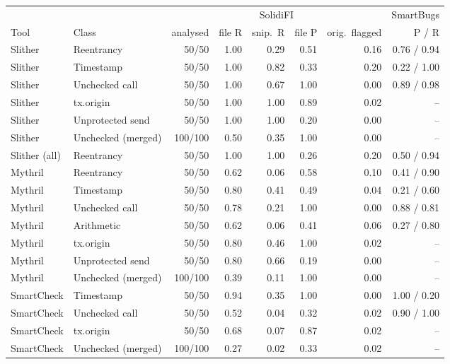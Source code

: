 \begin{tabular}{@{}llrrrrrr@{}}
\toprule
 & & \multicolumn{5}{c}{SolidiFI} & SmartBugs\\
\cmidrule(lr){3-7}\cmidrule(lr){8-8}
Tool & Class & analysed & file R & snip.\ R & file P & orig.\ flagged & P / R\\
\midrule
Slither & Reentrancy & 50/50 & 1.00 & 0.29 & 0.51 & 0.16 & 0.76 / 0.94\\
Slither & Timestamp & 50/50 & 1.00 & 0.82 & 0.33 & 0.20 & 0.22 / 1.00\\
Slither & Unchecked call & 50/50 & 1.00 & 0.67 & 1.00 & 0.00 & 0.89 / 0.98\\
Slither & tx.origin & 50/50 & 1.00 & 1.00 & 0.89 & 0.02 & --\\
Slither & Unprotected send & 50/50 & 1.00 & 1.00 & 0.20 & 0.00 & --\\
Slither & Unchecked (merged) & 100/100 & 0.50 & 0.35 & 1.00 & 0.00 & --\\
Slither (all) & Reentrancy & 50/50 & 1.00 & 1.00 & 0.26 & 0.20 & 0.50 / 0.94\\
Mythril & Reentrancy & 50/50 & 0.62 & 0.06 & 0.58 & 0.10 & 0.41 / 0.90\\
Mythril & Timestamp & 50/50 & 0.80 & 0.41 & 0.49 & 0.04 & 0.21 / 0.60\\
Mythril & Unchecked call & 50/50 & 0.78 & 0.21 & 1.00 & 0.00 & 0.88 / 0.81\\
Mythril & Arithmetic & 50/50 & 0.62 & 0.06 & 0.41 & 0.06 & 0.27 / 0.80\\
Mythril & tx.origin & 50/50 & 0.80 & 0.46 & 1.00 & 0.02 & --\\
Mythril & Unprotected send & 50/50 & 0.80 & 0.66 & 0.19 & 0.00 & --\\
Mythril & Unchecked (merged) & 100/100 & 0.39 & 0.11 & 1.00 & 0.00 & --\\
SmartCheck & Timestamp & 50/50 & 0.94 & 0.35 & 1.00 & 0.00 & 1.00 / 0.20\\
SmartCheck & Unchecked call & 50/50 & 0.52 & 0.04 & 0.32 & 0.02 & 0.90 / 1.00\\
SmartCheck & tx.origin & 50/50 & 0.68 & 0.07 & 0.87 & 0.02 & --\\
SmartCheck & Unchecked (merged) & 100/100 & 0.27 & 0.02 & 0.33 & 0.02 & --\\
\bottomrule
\end{tabular}
